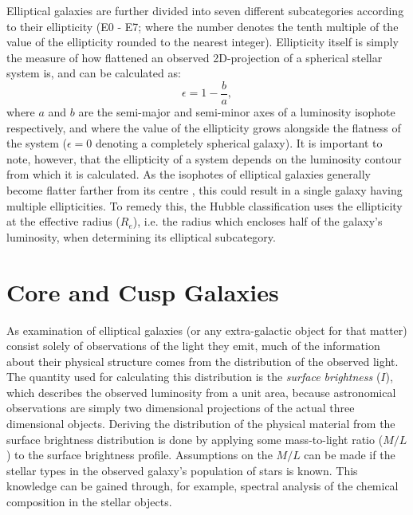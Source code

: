 \documentclass[english, oneside]{HYgradu}
\begin{document}
Elliptical galaxies are further divided into seven different subcategories according to their ellipticity (E0 - E7; where the number denotes the tenth multiple of the value of the ellipticity rounded to the nearest integer). Ellipticity itself is simply the measure of how flattened an observed 2D-projection of a spherical stellar system is, and can be calculated as:
\begin{equation}
\epsilon = 1 - \frac{b}{a},
\end{equation}
where $a$ and $b$ are the semi-major and semi-minor axes of a luminosity isophote respectively, and where the value of the ellipticity grows alongside the flatness of the system ($\epsilon = 0$ denoting a completely spherical galaxy). It is important to note, however, that the ellipticity of a system depends on the luminosity contour from which it is calculated. As the isophotes of elliptical galaxies generally become flatter farther from its centre \citep{BinneyTremaine}, this could result in a single galaxy having multiple ellipticities. To remedy this, the Hubble classification uses the ellipticity at the effective radius ($R_e$), i.e. the radius which encloses half of the galaxy's luminosity, when determining its elliptical subcategory.

\section{Core and Cusp Galaxies}

As examination of elliptical galaxies (or any extra-galactic object for that matter) consist solely of observations of the light they emit, much of the information about their physical structure comes from the distribution of the observed light. The quantity used for calculating this distribution is the \textit{surface brightness} ($I$), which describes the observed luminosity from a unit area, because astronomical observations are simply two dimensional projections of the actual three dimensional objects. Deriving the distribution of the physical material from the surface brightness distribution is done by applying some mass-to-light ratio ($M/L$) to the surface brightness profile. Assumptions on the $M/L$ can be made if the stellar types in the observed galaxy's population of stars is known. This knowledge can be
gained through, for example, spectral analysis of the chemical composition in the stellar objects.
\end{document}
